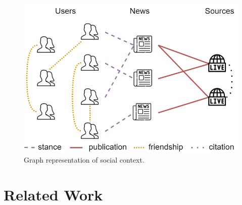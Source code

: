 \documentclass[sigconf]{acmart}
\theoremstyle{definition}
\theoremstyle{hypothesis}
\begin{document}
\begin{figure}[t]
\centering
\includegraphics[scale=0.25]{fang_graph.png}
\caption{Graph representation of social context.}
\label{fig:social_graph}
\end{figure}

\section{Related Work}\label{sec:related}
\end{document}
